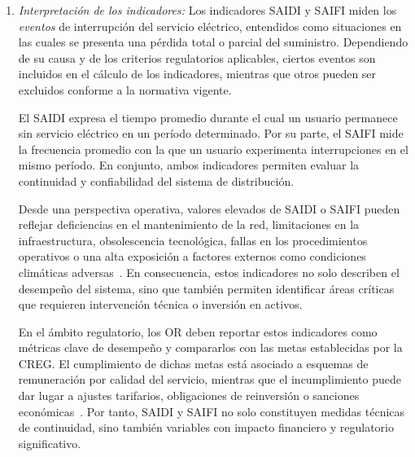 \begin{enumerate}
            
          \item \textit{Interpretación de los indicadores:}
            Los indicadores SAIDI y SAIFI miden los \textit{eventos} de interrupción del servicio eléctrico, entendidos como situaciones en las cuales se presenta una pérdida total o parcial del suministro. Dependiendo de su causa y de los criterios regulatorios aplicables, ciertos eventos son incluidos en el cálculo de los indicadores, mientras que otros pueden ser excluidos conforme a la normativa vigente.
    
            El SAIDI expresa el tiempo promedio durante el cual un usuario permanece sin servicio eléctrico en un período determinado. Por su parte, el SAIFI mide la frecuencia promedio con la que un usuario experimenta interrupciones en el mismo período. En conjunto, ambos indicadores permiten evaluar la continuidad y confiabilidad del sistema de distribución.
            
            Desde una perspectiva operativa, valores elevados de SAIDI o SAIFI pueden reflejar deficiencias en el mantenimiento de la red, limitaciones en la infraestructura, obsolescencia tecnológica, fallas en los procedimientos operativos o una alta exposición a factores externos como condiciones climáticas adversas~\cite{ref41,ref43}. En consecuencia, estos indicadores no solo describen el desempeño del sistema, sino que también permiten identificar áreas críticas que requieren intervención técnica o inversión en activos.
            
            En el ámbito regulatorio, los OR deben reportar estos indicadores como métricas clave de desempeño y compararlos con las metas establecidas por la CREG. El cumplimiento de dichas metas está asociado a esquemas de remuneración por calidad del servicio, mientras que el incumplimiento puede dar lugar a ajustes tarifarios, obligaciones de reinversión o sanciones económicas~\cite{ref1,ref44}. Por tanto, SAIDI y SAIFI no solo constituyen medidas técnicas de continuidad, sino también variables con impacto financiero y regulatorio significativo.
          

\end{enumerate}
